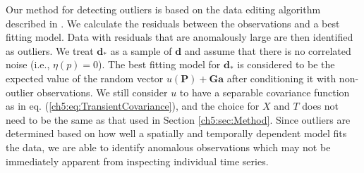 Our method for detecting outliers is based on the data editing algorithm described in \citet{Gibbs2011}. We calculate the residuals between the observations and a best fitting model. Data with residuals that are anomalously large are then identified as outliers. We treat $\mathbf{d}_*$ as a sample of $\mathbf{d}$ and assume that there is no correlated noise (i.e., $\eta(p) = 0$).  The best fitting model for $\mathbf{d}_*$ is considered to be the expected value of the random vector $u(\mathbf{P}) + \mathbf{G}\mathbf{a}$ after conditioning it with non-outlier observations.  We still consider $u$ to have a separable covariance function as in eq. (\ref{ch5:eq:TransientCovariance}), and the choice for $X$ and $T$ does not need to be the same as that used in Section \ref{ch5:sec:Method}. Since outliers are determined based on how well a spatially and temporally dependent model fits the data, we are able to identify anomalous observations which may not be immediately apparent from inspecting individual time series. 


